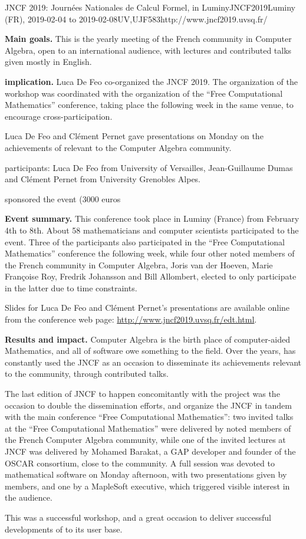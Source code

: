 \begin{event}{JNCF 2019: Journées Nationales de Calcul Formel, in Luminy}{JNCF2019}{Luminy (FR),
  2019-02-04 to
  2019-02-08}{UV,UJF}{58}{3}{http://www.jncf2019.uvsq.fr/}
  
\textbf{Main goals.} This is the yearly meeting of the French community in
Computer Algebra, open to an international audience, with lectures and
contributed talks given mostly in English.

\textbf{\ODK implication.} Luca De Feo co-organized the JNCF 2019. The
organization of the workshop was coordinated with the organization of
the ``Free Computational Mathematics'' conference, taking place the
following week in the same venue, to encourage cross-participation.

Luca De Feo and Clément Pernet gave presentations on Monday on the
achievements of \ODK relevant to the Computer Algebra
community.

\ODK participants: Luca De Feo from University of Versailles,
Jean-Guillaume Dumas and Clément Pernet from University Grenobles
Alpes.

\ODK sponsored the event (3000 euros %

\textbf{Event summary.} This conference took place in Luminy (France) from
February 4th to 8th. About 58 mathematicians and computer scientists
participated to the event. Three of the participants also participated
in the ``Free Computational Mathematics'' conference the following
week, while four other noted members of the French community in
Computer Algebra, Joris van der Hoeven, Marie Françoise Roy, Fredrik
Johansson and Bill Allombert, elected to only participate in the latter
due to time constraints.

Slides for Luca De Feo and Clément Pernet's presentations are
available online from the conference web page:
\url{http://www.jncf2019.uvsq.fr/edt.html}.

\textbf{Results and impact.} Computer Algebra is the birth place of
computer-aided Mathematics, and all of \ODK software owe something to
the field. Over the years, \ODK has constantly used the JNCF as an
occasion to disseminate its achievements relevant to the community,
through contributed talks.

The last edition of JNCF to happen concomitantly with the project was
the occasion to double the dissemination efforts, and organize the
JNCF in tandem with the main \ODK conference ``Free Computational
Mathematics'': two invited talks at the ``Free Computational
Mathematics'' were delivered by noted members of the French Computer
Algebra community, while one of the invited lectures at JNCF was
delivered by Mohamed Barakat, a GAP developer and founder of the OSCAR
consortium, close to the \ODK community. A full session was devoted to
mathematical software on Monday afternoon, with two presentations
given by \ODK members, and one by a MapleSoft executive, which
triggered visible interest in the audience.

This was a successful workshop, and a great occasion to deliver 
successful developments of \ODK to its user base.
\end{event}
